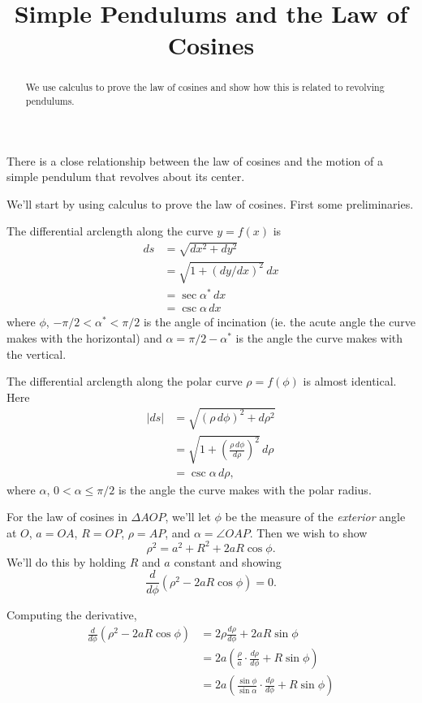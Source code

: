 \documentclass{ximera}
\title{Simple Pendulums and the Law of Cosines}
\begin{document}
\begin{abstract}
We use calculus to prove the law of cosines and show how this is related to revolving pendulums.
\end{abstract}
\maketitle

There is a close relationship between the law of cosines and the motion of a simple pendulum that revolves about its center.

We'll start by using calculus to prove the law of cosines. First some preliminaries.

The differential arclength along the curve $y=f(x)$ is
\begin{align*}
   ds   &= \sqrt{dx^2 + dy^2} \\
         & = \sqrt{1+\left( dy/dx  \right)^2} \, dx \\
         &= \sec\alpha^* \, dx \\
         &= \csc \alpha \, dx
\end{align*}
where $\phi$, $-\pi/2 < \alpha^* <\pi/2$ is the angle of incination (ie. the acute angle the curve makes with the horizontal) and $\alpha = \pi/2 - \alpha^*$ is the angle the curve makes with the vertical.

The differential arclength along the polar curve $\rho = f(\phi)$ is almost identical. Here
\begin{align*}
   |ds|   &= \sqrt{(\rho \, d\phi)^2 + d\rho^2} \\
         & = \sqrt{1 + \left( \frac{\rho\, d\phi}{d\rho}\right)^2} \, d\rho \\
         &= \csc \alpha \, d\rho ,
\end{align*}
where $\alpha$, $0<\alpha \leq \pi/2$ is the angle the curve makes with the polar radius.

For the law of cosines in $\Delta AOP$, we'll let $\phi$ be the measure of the \emph{exterior} angle at $O$, $a=OA$, $R = OP$, $\rho = AP$, and $\alpha = \angle OAP$. Then we wish to show
\[
        \rho^2 = a^2 + R^2 + 2aR\cos\phi .
\]
We'll do this by holding $R$ and $a$ constant and showing
\[
   \frac{d}{d\phi} \left(   \rho^2 - 2aR\cos\phi  \right) = 0 .
\]

Computing the derivative,
\begin{align*}
  \frac{d}{d\phi} \left(   \rho^2 - 2aR\cos\phi  \right)  &= 2\rho \frac{d\rho}{d\phi}+ 2aR\sin\phi  \\
                              &=2a \left(  \frac{\rho}{a} \cdot \frac{d\rho}{d\phi}   + R\sin\phi  \right) \\
                              &= 2a \left(  \frac{\sin\phi}{\sin\alpha} \cdot \frac{d\rho}{d\phi}  + R\sin\phi   \right)\\
\end{align*}
\end{document}
